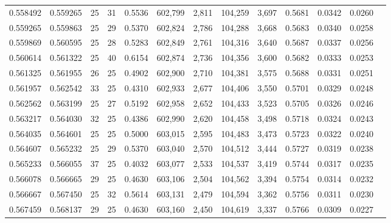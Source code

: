 \begin{tabular}{rrrrrrrrrrrrr}
0.558492 & 0.559265 &    25 &  31 &                                     0.5536 & 602,799 &   2,811 & 104,259 &   3,697 & 0.5681 & 0.0342 & 0.0260 \\
0.559265 & 0.559863 &    25 &  29 &                                     0.5370 & 602,824 &   2,786 & 104,288 &   3,668 & 0.5683 & 0.0340 & 0.0258 \\
0.559869 & 0.560595 &    25 &  28 &                                     0.5283 & 602,849 &   2,761 & 104,316 &   3,640 & 0.5687 & 0.0337 & 0.0256 \\
0.560614 & 0.561322 &    25 &  40 &                                     0.6154 & 602,874 &   2,736 & 104,356 &   3,600 & 0.5682 & 0.0333 & 0.0253 \\
0.561325 & 0.561955 &    26 &  25 &                                     0.4902 & 602,900 &   2,710 & 104,381 &   3,575 & 0.5688 & 0.0331 & 0.0251 \\
0.561957 & 0.562542 &    33 &  25 &                                     0.4310 & 602,933 &   2,677 & 104,406 &   3,550 & 0.5701 & 0.0329 & 0.0248 \\
0.562562 & 0.563199 &    25 &  27 &                                     0.5192 & 602,958 &   2,652 & 104,433 &   3,523 & 0.5705 & 0.0326 & 0.0246 \\
0.563217 & 0.564030 &    32 &  25 &                                     0.4386 & 602,990 &   2,620 & 104,458 &   3,498 & 0.5718 & 0.0324 & 0.0243 \\
0.564035 & 0.564601 &    25 &  25 &                                     0.5000 & 603,015 &   2,595 & 104,483 &   3,473 & 0.5723 & 0.0322 & 0.0240 \\
0.564607 & 0.565232 &    25 &  29 &                                     0.5370 & 603,040 &   2,570 & 104,512 &   3,444 & 0.5727 & 0.0319 & 0.0238 \\
0.565233 & 0.566055 &    37 &  25 &                                     0.4032 & 603,077 &   2,533 & 104,537 &   3,419 & 0.5744 & 0.0317 & 0.0235 \\
0.566078 & 0.566665 &    29 &  25 &                                     0.4630 & 603,106 &   2,504 & 104,562 &   3,394 & 0.5754 & 0.0314 & 0.0232 \\
0.566667 & 0.567450 &    25 &  32 &                                     0.5614 & 603,131 &   2,479 & 104,594 &   3,362 & 0.5756 & 0.0311 & 0.0230 \\
0.567459 & 0.568137 &    29 &  25 &                                     0.4630 & 603,160 &   2,450 & 104,619 &   3,337 & 0.5766 & 0.0309 & 0.0227 \\

\end{tabular}

